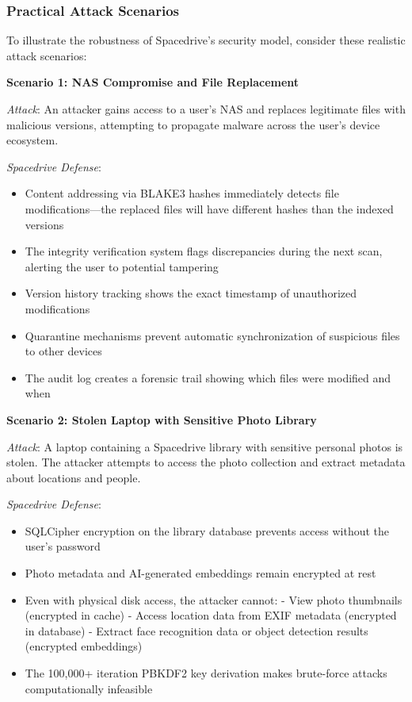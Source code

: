 \documentclass[sigconf]{acmart}
\begin{document}
\subsubsection{Practical Attack Scenarios}
To illustrate the robustness of Spacedrive's security model, consider these realistic attack scenarios:

\textbf{Scenario 1: NAS Compromise and File Replacement}

\emph{Attack}: An attacker gains access to a user's NAS and replaces legitimate files with malicious versions, attempting to propagate malware across the user's device ecosystem.

\emph{Spacedrive Defense}:
\begin{itemize}[noitemsep, topsep=0pt]
\item Content addressing via BLAKE3 hashes immediately detects file modifications---the replaced files will have different hashes than the indexed versions
\item The integrity verification system flags discrepancies during the next scan, alerting the user to potential tampering
\item Version history tracking shows the exact timestamp of unauthorized modifications
\item Quarantine mechanisms prevent automatic synchronization of suspicious files to other devices
\item The audit log creates a forensic trail showing which files were modified and when
\end{itemize}

\textbf{Scenario 2: Stolen Laptop with Sensitive Photo Library}

\emph{Attack}: A laptop containing a Spacedrive library with sensitive personal photos is stolen. The attacker attempts to access the photo collection and extract metadata about locations and people.

\emph{Spacedrive Defense}:
\begin{itemize}[noitemsep, topsep=0pt]
\item SQLCipher encryption on the library database prevents access without the user's password
\item Photo metadata and AI-generated embeddings remain encrypted at rest
\item Even with physical disk access, the attacker cannot:
  - View photo thumbnails (encrypted in cache)
  - Access location data from EXIF metadata (encrypted in database)
  - Extract face recognition data or object detection results (encrypted embeddings)
\item The 100,000+ iteration PBKDF2 key derivation makes brute-force attacks computationally infeasible
\end{itemize}
\end{document}
